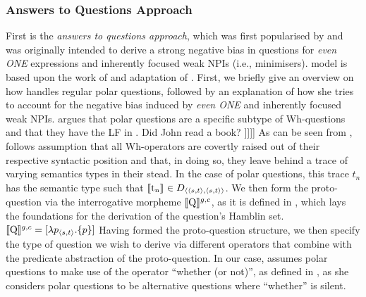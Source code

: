 \subsubsection{Answers to Questions Approach}
First is the \textit{answers to questions approach}, which was first popularised by \textcite{Guerzoni2003,Guerzoni2004} and was originally intended to derive a strong negative bias in questions for \textit{even \MakeUppercase{one}} expressions and inherently focused weak NPIs (i.e., minimisers).  model is based upon the work of \textcite{Hamblin1973} and  adaptation of \textcite{Karttunen1977}. First, we briefly give an overview on how \textcite{Guerzoni2003,Guerzoni2004} handles regular polar questions, followed by an explanation of how she tries to account for the negative bias induced by \textit{even \MakeUppercase{one}} and inherently focused weak NPIs. \textcite{Guerzoni2003,Guerzoni2004} argues that polar questions are a specific subtype of Wh-questions and that they have the LF in .
\pex[nopreamble=true]%
\a{} Did John read a book?
\a[]\phantomsection [ whether-(or-not) [ 1 [ Q [ t\textsubscript{1} [ John read a book ]\hspace{0.5mm}]\hspace{0.5mm}]\hspace{0.5mm}]\hspace{0.5mm}]
\xe
As can be seen from , \textcite{Guerzoni2003,Guerzoni2004} follows  assumption that all Wh-operators are covertly raised out of their respective syntactic position and that, in doing so, they leave behind a trace of varying semantics types in their stead. In the case of polar questions, this trace $t_n$ has the semantic type such that $\intension[]{t\textsubscript{n}}\in D_{\langle\langle s,t\rangle,\langle s,t\rangle\rangle}$. We then form the proto-question via the interrogative morpheme $\intension[g,c]{Q}$, as it is defined in , which lays the foundations for the derivation of the question's Hamblin set.
\ex{}
$\intension[g,c]{Q}=[\lambda{p}_{\langle s,t\rangle}.\{p\}]$
\xe
Having formed the proto-question structure, we then specify the type of question we wish to derive via different operators that combine with the predicate abstraction of the proto-question. In our case, \textcite{Guerzoni2003,Guerzoni2004} assumes polar questions to make use of the operator \enquote{whether (or not)}, as defined in , as she considers polar questions to be alternative questions where \enquote{whether} is silent.
